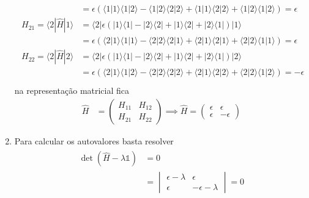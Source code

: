 \begin{prob}
\begin{sol}
\begin{enumerate}[label=\alph *)]
\begin{align}
\begin{split}
																										 &=\epsilon \left(\langle{1}|1\rangle\langle 1|{2}\rangle-\langle{1}|2\rangle\langle  2|{2}\rangle+\langle{1}|1\rangle\langle  2|{2}\rangle+\langle{1}|2\rangle\langle  1|{2}\rangle\right)=\epsilon\\
							H_{21} = \langle{2}|\hat{H}|{1}\rangle &= \langle{2}|\epsilon \left(|1\rangle\langle 1|-|2\rangle\langle  2|+|1\rangle\langle  2|+|2\rangle\langle  1|\right)|{1}\rangle\\
																										 &=\epsilon \left(\langle{2}|1\rangle\langle 1|{1}\rangle-\langle{2}|2\rangle\langle  2|{1}\rangle+\langle{2}|1\rangle\langle  2|{1}\rangle+\langle{2}|2\rangle\langle  1|{1}\rangle\right)=\epsilon\\
							H_{22} = \langle{2}|\hat{H}|{2}\rangle &= \langle{2}|\epsilon \left(|1\rangle\langle 1|-|2\rangle\langle  2|+|1\rangle\langle  2|+|2\rangle\langle  1|\right)|{2}\rangle\\
																										 &=\epsilon \left(\langle{2}|1\rangle\langle 1|{2}\rangle-\langle{2}|2\rangle\langle  2|{2}\rangle+\langle{2}|1\rangle\langle  2|{2}\rangle+\langle{2}|2\rangle\langle  1|{2}\rangle\right)=-\epsilon\\
						\end{split}
					\end{align}
					na representação matricial fica
					\begin{align}
						\hat{H} &=
						\begin{pmatrix}
							H_{11} & H_{12}\\
							H_{21} & H_{22}
						\end{pmatrix}\implies
						\boxed{\hat{H}=
							\begin{pmatrix}
								\epsilon & \epsilon \\
								\epsilon & -\epsilon
							\end{pmatrix}
						}
					\end{align}
					\item  Para calcular os autovalores basta resolver
						\begin{align}
							\begin{split}
								\det \left(\hat{H}-\lambda\mathbb{1}\right) &= 0\\
																														&=
																														\begin{vmatrix}
																															\epsilon-\lambda & \epsilon \\
																															\epsilon & -\epsilon-\lambda
																														\end{vmatrix}=0\\

\end{split}
\end{align}
\end{enumerate}
\end{sol}
\end{prob}
